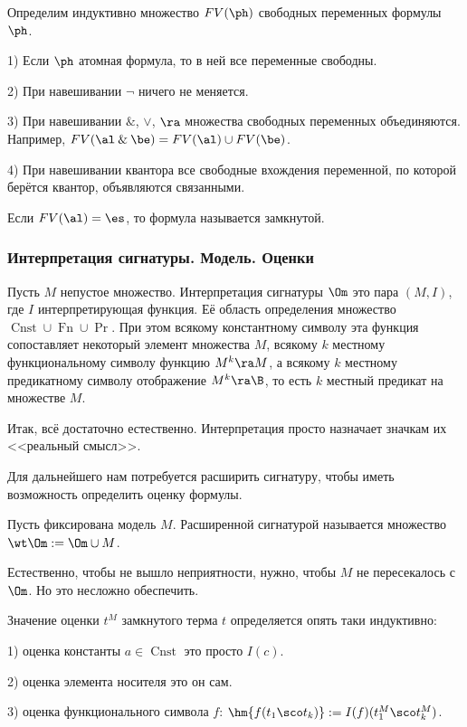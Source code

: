 \documentclass[a4paper,draft]{article}
\let\amper\&
\def\&{\mathbin{\amper}}
\DeclareMathOperator{\Cnst}{Cnst}
\DeclareMathOperator{\Fn}{Fn}
\begin{document}
Определим индуктивно множество $FV(\ph)$ свободных переменных формулы $\ph$.

1) Если $\ph$ атомная формула, то в ней все переменные свободны.

2) При навешивании $\neg$ ничего не меняется.

3) При навешивании $\&$, $\vee$, $\ra$ множества свободных переменных объединяются.
Например, $FV(\al \& \be) = FV(\al) \cup FV(\be)$.

4) При навешивании квантора все свободные вхождения переменной, по которой берётся
квантор, объявляются связанными.

\begin{df}
  Если $FV(\al) = \es$, то формула называется замкнутой.
\end{df}

\subsubsection{Интерпретация сигнатуры. Модель. Оценки}

Пусть $M$ непустое множество. Интерпретация сигнатуры $\Om$ это пара $(M, I)$,
где $I$ интерпретирующая функция. Её область определения множество $\Cnst \cup \Fn \cup \Pr$.
При этом всякому константному символу эта функция сопоставляет некоторый элемент множества $M$,
всякому $k$ местному функциональному символу функцию $M^k \ra M$, а всякому $k$ местному
предикатному  символу отображение $M^k \ra \B$, то есть $k$ местный предикат на множестве $M$.

Итак, всё достаточно естественно. Интерпретация просто назначает значкам их <<реальный смысл>>.

Для дальнейшего нам потребуется расширить сигнатуру, чтобы иметь возможность определить оценку формулы.

\begin{df}
  Пусть фиксирована модель $M$. Расширенной сигнатурой называется множество $\wt\Om := \Om \cup M$.
\end{df}

\begin{note}
  Естественно, чтобы не вышло неприятности, нужно, чтобы $M$ не пересекалось с $\Om$. Но это несложно обеспечить.
\end{note}


\begin{df}
  Значение оценки $t^M$ замкнутого терма $t$ определяется опять таки индуктивно:

  1) оценка константы $a \in \Cnst$ это просто $I(c)$.

  2) оценка элемента носителя это он сам.

  3) оценка функционального символа $f$: $\hm{f(t_1\sco t_k)} := I(f)(t_1^M\sco t_k^M)$.
\end{df}
\end{document}
